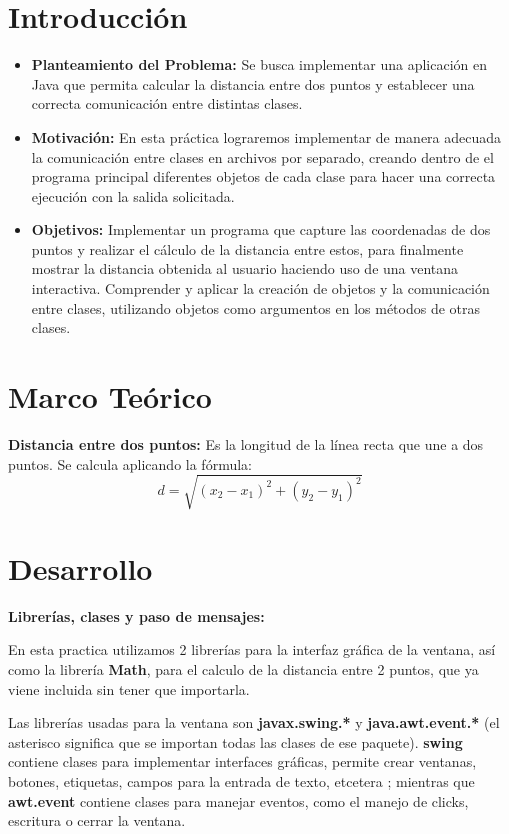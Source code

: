 \documentclass[letterpaper,12pt]{article}
\begin{document}
\tableofcontents
\clearpage

\section{Introducción}

\begin{itemize}
\item \textbf{Planteamiento del Problema:} Se busca implementar una aplicación en Java que permita calcular la distancia entre dos puntos y establecer una correcta comunicación entre distintas clases.  

\item \textbf{Motivación:} En esta práctica lograremos implementar de manera adecuada la comunicación entre clases en archivos por separado, creando dentro de el programa principal diferentes objetos de cada clase para hacer una correcta ejecución con la salida solicitada.

\item \textbf{Objetivos:} Implementar un programa que capture las coordenadas de dos puntos y realizar el cálculo de la distancia entre estos, para finalmente mostrar la distancia obtenida al usuario haciendo uso de una ventana interactiva. 
Comprender y aplicar la creación de objetos y la comunicación entre clases, utilizando objetos como argumentos en los métodos de otras clases.


\end{itemize}
\section{Marco Teórico}

\textbf{Distancia entre dos puntos:} Es la longitud de la línea recta que une a dos puntos. Se calcula aplicando la fórmula: ~\cite{distancia}
\[
d = \sqrt{(x_2 - x_1)^2 + (y_2 - y_1)^2}
\]

\section{Desarrollo}

\textbf{Librerías, clases y paso de mensajes:}

En esta practica utilizamos 2 librerías para la interfaz gráfica de la ventana, así como la librería \textbf{Math}, para el calculo de la distancia entre 2 puntos, que ya viene incluida sin tener que importarla.

Las librerías usadas para la ventana son \textbf{javax.swing.*} y \textbf{java.awt.event.*} (el asterisco significa que se importan todas las clases de ese paquete). \textbf{swing} contiene clases para implementar interfaces gráficas, permite crear ventanas, botones, etiquetas, campos para la entrada de texto, etcetera ; mientras que \textbf{awt.event} contiene clases para manejar eventos, como el manejo de clicks, escritura o cerrar la ventana.
\end{document}
